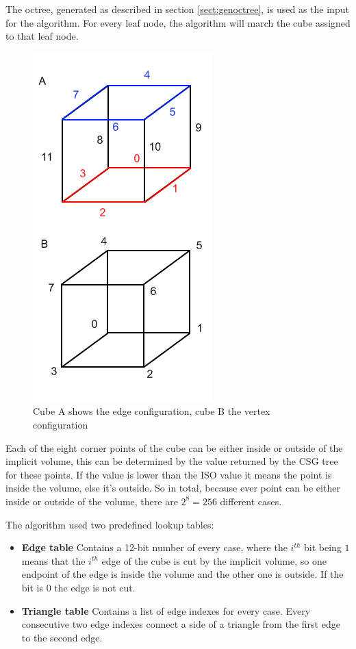 \documentclass[a4paper,10pt,twocolumn]{article}
\begin{document}
The octree, generated as described in section \ref{sect:genoctree}, is used as the input for the algorithm. For every leaf node, the algorithm will march the cube assigned to that leaf node.

    \begin{figure}[h]
        \begin{center}
            \includegraphics[scale=0.6]{./images/cube_config}
        \end{center}
        \caption{Cube A shows the edge configuration, cube B the vertex configuration}
        \label{figure:cube_config}
    \end{figure}

Each of the eight corner points of the cube can be either inside or outside of the implicit volume, this can be determined by the value returned by the CSG tree for these points. If the value is lower than the ISO value it means the point is inside the volume, else it's outside. So in total, because ever point can be either inside or outside of the volume, there are $2^8 = 256$ different cases.

The algorithm used two predefined lookup tables:

\begin{itemize}
    \item[] \textbf{Edge table} Contains a 12-bit number of every case, where the $i^{th}$ bit being $1$ means that the $i^{th}$ edge of the cube is cut by the implicit volume, so one endpoint of the edge is inside the volume and the other one is outside. If the bit is $0$ the edge is not cut.
    \item[] \textbf{Triangle table} Contains a list of edge indexes for every case. Every consecutive two edge indexes connect a side of a triangle from the first edge to the second edge.
\end{itemize}
\end{document}
